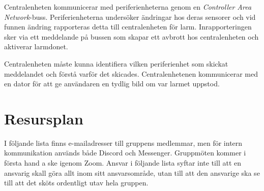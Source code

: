 \documentclass[a4paper]{article}
\begin{document}
Centralenheten kommunicerar med periferienheterna genom en \textit{Controller Area Network}-buss. Periferienheterna undersöker ändringar hos deras sensorer och vid funnen ändring rapporteras detta till centralenheten för larm. Inrapporteringen sker via ett meddelande på bussen som skapar ett avbrott hos centralenheten och aktiverar larmdonet.

Centralenheten måste kunna identifiera vilken periferienhet som skickat meddelandet och förstå varför det skicades. Centralenhetenen kommunicerar med en dator för att ge användaren en tydlig bild om var larmet uppstod.

\section{Resursplan}

I följande lista finns e-mailadresser till gruppens medlemmar, men för intern kommunikation används både Discord och Messenger. Gruppmöten kommer i första hand a ske igenom Zoom.
Ansvar i följande lista syftar inte till att en ansvarig skall göra allt inom sitt ansvarsområde, utan till att den ansvarige ska se till att det sköts ordentligt utav hela gruppen.
\end{document}
